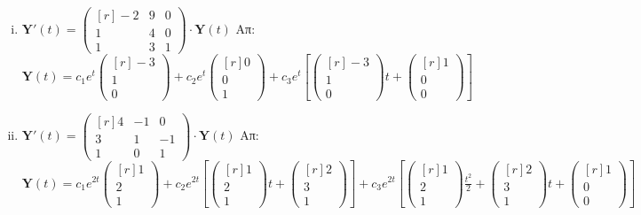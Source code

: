 \begin{enumerate}
\begin{enumerate}[i)]
      \item $ \mathbf{Y}'(t) = 
        \begin{pmatrix*}[r]
          -2 & 9 & 0 \\
          1 & 4 & 0 \\
          1 & 3 & 1
        \end{pmatrix*} \cdot 
        \mathbf{Y}(t) $
        \hfill Απ: {\scriptsize $ \mathbf{Y}(t) = c_{1}e^{t} 
          \begin{pmatrix*}[r] -3 \\ 1 \\ 0 \end{pmatrix*} + c_{2} e^{t}
          \begin{pmatrix*}[r] 0 \\ 0 \\ 1 \end{pmatrix*} + c_{3} e^{t} \left[
            \begin{pmatrix*}[r] -3 \\ 1 \\ 0 \end{pmatrix*}t +
        \begin{pmatrix*}[r] 1 \\ 0 \\ 0 \end{pmatrix*} \right] $}

      \item $ \mathbf{Y}'(t) = 
        \begin{pmatrix*}[r]
          4 & -1 & 0 \\
          3 & 1 & -1 \\
          1 & 0 & 1
        \end{pmatrix*} \cdot 
        \mathbf{Y}(t)$
        \hfill Απ: {\scriptsize $ \mathbf{Y}(t)= c_{1} e^{2t}
          \begin{pmatrix*}[r] 1 \\ 2 \\ 1 \end{pmatrix*} + c_{2}e^{2t} \left[ 
            \begin{pmatrix*}[r] 1 \\ 2 \\ 1 \end{pmatrix*}t + 
          \begin{pmatrix*}[r] 2 \\ 3 \\ 1 \end{pmatrix*} \right] + c_{3}e^{2t} \left[
          \begin{pmatrix*}[r] 1 \\ 2 \\ 1 \end{pmatrix*} \frac{t^{2}}{2} +  
          \begin{pmatrix*}[r] 2 \\ 3 \\ 1 \end{pmatrix*} t + 
      \begin{pmatrix*}[r] 1 \\ 0 \\ 0 \end{pmatrix*}\right]  $} 


\end{enumerate}
\end{enumerate}
